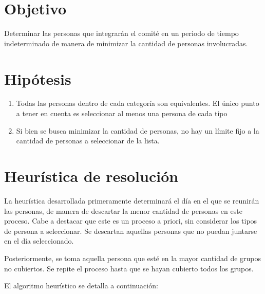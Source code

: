 \documentclass[a4paper,11pt]{article}
\begin{document}
\section{Objetivo}

Determinar las personas que integrarán el comité en un periodo de tiempo
indeterminado de manera de minimizar la cantidad de personas involucradas.

\section{Hipótesis}

\begin{enumerate}

  \item Todas las personas dentro de cada categoría son equivalentes. El único
    punto a tener en cuenta es seleccionar al menos una persona de cada tipo

  \item Si bien se busca minimizar la cantidad de personas, no hay un límite
    fijo a la cantidad de personas a seleccionar de la lista.

\end{enumerate}

\section{Heurística de resolución}

La heurística desarrollada primeramente determinará el día en el que se
reunirán las personas, de manera de descartar la menor cantidad de personas en
este proceso. Cabe a destacar que este es un proceso a priori, sin considerar
los tipos de persona a seleccionar. Se descartan aquellas personas que no
puedan juntarse en el día seleccionado.

Posteriormente, se toma aquella persona que esté en la mayor cantidad de grupos
no cubiertos. Se repite el proceso hasta que se hayan cubierto todos los
grupos.

El algoritmo heurístico se detalla a continuación:
\end{document}

